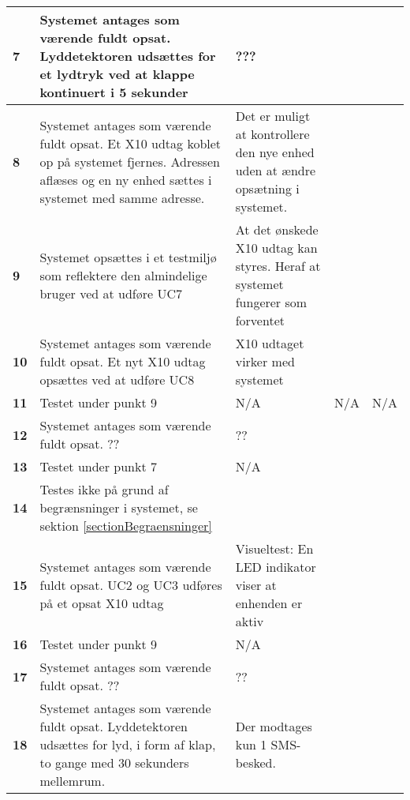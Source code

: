 \begin{center}
\begin{longtable}{|p{}|p{}|p{}|p{}|p{}|}
\textbf{7} &
Systemet antages som værende fuldt opsat.\newline
Lyddetektoren udsættes for et lydtryk ved at klappe kontinuert i 5 sekunder &
??? &
 &
 \\\hline

\textbf{8} &
Systemet antages som værende fuldt opsat.\newline
Et X10 udtag koblet op på systemet fjernes. Adressen aflæses og en ny enhed sættes i systemet med samme adresse.&
Det er muligt at kontrollere den nye enhed uden at ændre opsætning i systemet.&
 &
 \\\hline

\textbf{9} &
Systemet opsættes i et testmiljø som reflektere den almindelige bruger ved at udføre UC7&
At det ønskede X10 udtag kan styres. Heraf at systemet fungerer som forventet&
 &
 \\\hline

\textbf{10} &
Systemet antages som værende fuldt opsat.\newline
Et nyt X10 udtag opsættes ved at udføre UC8 &
X10 udtaget virker med systemet&
 &
 \\\hline

\textbf{11} &
Testet under punkt 9&
N/A &
N/A &
N/A \\\hline

\textbf{12} &
Systemet antages som værende fuldt opsat.\newline
??&
??&
 &
 \\\hline

\textbf{13} &
Testet under punkt 7&
N/A &
 &
 \\\hline

\textbf{14} &
Testes ikke på grund af begrænsninger i systemet, se sektion \ref{sectionBegraensninger}&
&
 &
 \\\hline

\textbf{15} &
Systemet antages som værende fuldt opsat.\newline
UC2 og UC3 udføres på et opsat X10 udtag&
Visueltest: En LED indikator viser at enhenden er aktiv&
 &
 \\\hline

\textbf{16} &
Testet under punkt 9&
N/A &
 &
 \\\hline

\textbf{17} &
Systemet antages som værende fuldt opsat.\newline
??&
??&
 &
 \\\hline

\textbf{18} &
Systemet antages som værende fuldt opsat.\newline
Lyddetektoren udsættes for lyd, i form af klap, to gange med 30 sekunders mellemrum.&
Der modtages kun 1 SMS-besked.&
 &
 \\\hline


\end{longtable}
\end{center}
